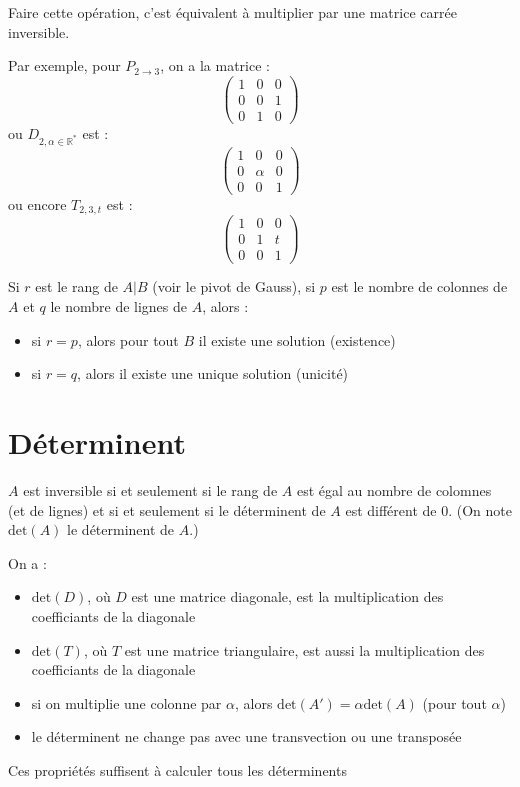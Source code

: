 \documentclass[a4paper, titlepage]{article}
\begin{document}
	Faire cette opération, c'est équivalent à multiplier par une matrice carrée inversible.

	Par exemple, pour $P_{2\to 3}$, on a la matrice :
	$$ \begin{pmatrix} 1&0&0\\0&0&1\\0&1&0 \end{pmatrix}  $$
	ou $D_{2, \alpha\in\mathbb{R}^*}$ est :
	$$ \begin{pmatrix} 1&0&0\\0&\alpha&0\\0&0&1 \end{pmatrix}  $$
	ou encore $T_{2,3,t}$ est :
	$$ \begin{pmatrix} 1&0&0\\0&1&t\\0&0&1 \end{pmatrix}  $$
	\begin{thm}
		Si $r$ est le rang de $A|B$ (voir le pivot de Gauss), si $p$ est le nombre de colonnes de $A$ et $q$ le nombre de lignes de $A$, alors :
		\begin{itemize}
			\item si $r=p$, alors pour tout $B$ il existe une solution (existence)
			\item si $r=q$, alors il existe une unique solution (unicité)
		\end{itemize}
	\end{thm}
	\section{Déterminent}
	\begin{thm}
		$A$ est inversible si et seulement si le rang de $A$ est égal au nombre de colomnes (et de lignes) et si et seulement si le déterminent de $A$ est différent de 0. (On note $\mathrm{det}(A)$ le déterminent de $A$.)
	\end{thm}
	\begin{props}
		On a :
		\begin{itemize}
			\item $\mathrm{det}(D)$, où $D$ est une matrice diagonale, est la multiplication des coefficiants de la diagonale
			\item $\mathrm{det}(T)$, où $T$ est une matrice triangulaire, est aussi la multiplication des coefficiants de la diagonale
			\item si on multiplie une colonne par $\alpha$, alors $\mathrm{det}(A') = \alpha\mathrm{det}(A)$ (pour tout $\alpha$) 
			\item le déterminent ne change pas avec une transvection ou une transposée
		\end{itemize}
	\end{props}
	Ces propriétés suffisent à calculer tous les déterminents
\end{document}
